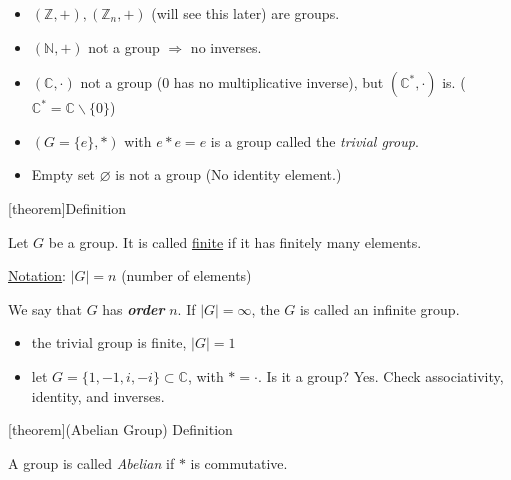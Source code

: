 \documentclass[12pt]{report}
\theoremstyle{definition}
\begin{document}
\begin{ex}
    \;

    \begin{itemize}
        \item $(\mathbb{Z}, +), (\mathbb{Z}_n, +)$ (will see this later) are groups.
        \item $(\mathbb{N}, +)$ not a group $\Rightarrow$ no inverses.
        \item $(\mathbb{C}, \cdot)$ not a group (0 has no multiplicative inverse),
            but $(\mathbb{C}^{*}, \cdot)$ is. ($\mathbb{C}^{*} = \mathbb{C}\backslash \{0\}$)
        \item $(G = \{e\}, *)$ with $e * e = e$ is a group called the \emph{trivial group}.
        \item Empty set $\varnothing$ is not a group (No identity element.)
    \end{itemize}
    
\end{ex}

[theorem]{Definition}
\begin{finite group}
    Let $G$ be a group. It is called \underline{finite} if it has finitely many elements.
    
    \underline{Notation}: $|G| = n$ (number of elements)
    
    We say that $G$ has \textbf{\emph{order}} $n$.  
    If $|G| = \infty$, the $G$ is called an infinite group.
\end{finite group}

\begin{ex}
    \;

    \begin{itemize}
        \item the trivial group is finite, $|G| = 1$
        \item let $G = \{1, -1, i, -i\} \subset \mathbb{C}$, with $* = \cdot$.
            Is it a group? Yes. Check associativity, identity, and inverses.
    \end{itemize}
    
\end{ex}

[theorem]{(Abelian Group) Definition}
\begin{abelian group}
    A group is called \emph{Abelian} if $*$ is commutative.
\end{abelian group}
\end{document}
